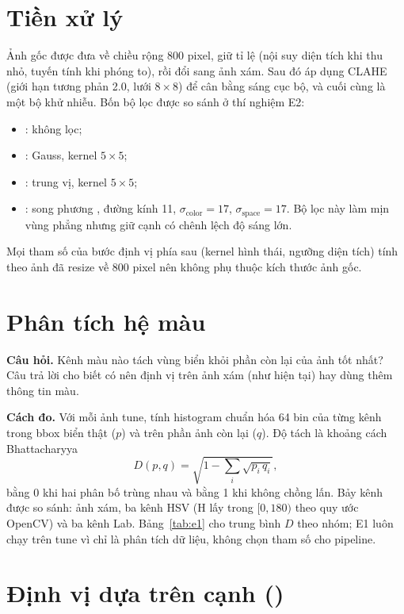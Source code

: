 \section{Tiền xử lý}
\label{sec:preprocess}

Ảnh gốc được đưa về chiều rộng 800 pixel, giữ tỉ lệ (nội suy diện tích khi thu nhỏ, tuyến tính khi phóng to), rồi đổi sang ảnh xám. Sau đó áp dụng CLAHE \cite{clahe} (giới hạn tương phản 2.0, lưới $8\times 8$) để cân bằng sáng cục bộ, và cuối cùng là một bộ khử nhiễu. Bốn bộ lọc được so sánh ở thí nghiệm E2:
\begin{itemize}
  \item {}: không lọc;
  \item {}: Gauss, kernel $5\times 5$;
  \item {}: trung vị, kernel $5\times 5$;
  \item {}: song phương \cite{bilateral}, đường kính 11, $\sigma_{\text{color}}=17$, $\sigma_{\text{space}}=17$. Bộ lọc này làm mịn vùng phẳng nhưng giữ cạnh có chênh lệch độ sáng lớn.
\end{itemize}
Mọi tham số của bước định vị phía sau (kernel hình thái, ngưỡng diện tích) tính theo ảnh đã resize về 800 pixel nên không phụ thuộc kích thước ảnh gốc.

\section{Phân tích hệ màu}
\label{sec:color}

\textbf{Câu hỏi.} Kênh màu nào tách vùng biển khỏi phần còn lại của ảnh tốt nhất? Câu trả lời cho biết có nên định vị trên ảnh xám (như  hiện tại) hay dùng thêm thông tin màu.

\textbf{Cách đo.} Với mỗi ảnh tune, tính histogram chuẩn hóa 64 bin của từng kênh trong bbox biển thật ($p$) và trên phần ảnh còn lại ($q$). Độ tách là khoảng cách Bhattacharyya
\[
D(p,q)=\sqrt{1-\sum_{i}\sqrt{p_i\,q_i}},
\]
bằng 0 khi hai phân bố trùng nhau và bằng 1 khi không chồng lấn. Bảy kênh được so sánh: ảnh xám, ba kênh HSV (H lấy trong $[0,180)$ theo quy ước OpenCV) và ba kênh Lab. Bảng~\ref{tab:e1} cho trung bình $D$ theo nhóm; E1 luôn chạy trên tune vì chỉ là phân tích dữ liệu, không chọn tham số cho pipeline.

\section{Định vị dựa trên cạnh ()}
\label{sec:edge}

